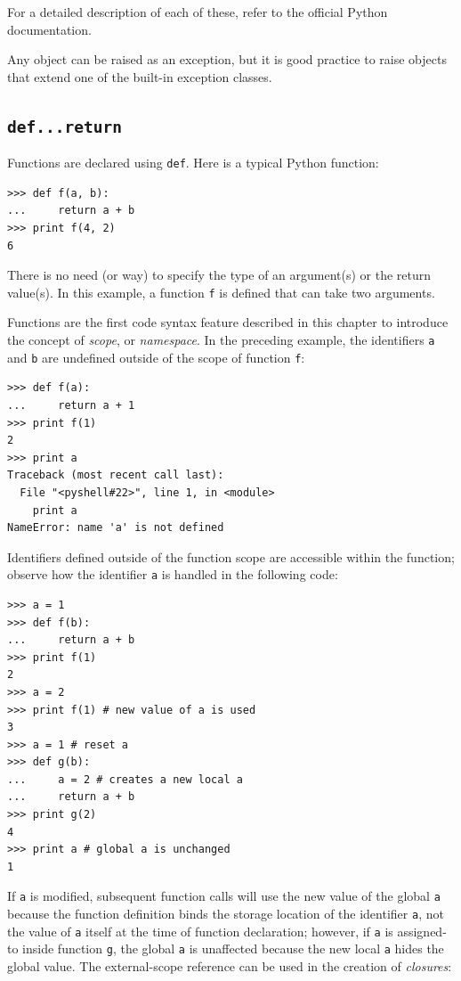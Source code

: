 \documentclass[justified,sixbynine]{tufte-book}
\def\ft{\small\tt}
\theoremstyle{plain}%
\theoremstyle{definition}
\theoremstyle{remark}
\begin{document}
\begin{fullwidth}
For a detailed description of each of these, refer to the official Python documentation.

Any object can be raised as an exception, but it is good practice to raise objects that extend one of the built-in exception classes.

\goodbreak\subsection{{\ft def...return}}

 

Functions are declared using {\ft def}.  Here is a typical Python function:
\begin{lstlisting}
>>> def f(a, b):
...     return a + b
>>> print f(4, 2)
6
\end{lstlisting}

There is no need (or way) to specify the type of an argument(s) or the return value(s). In this example, a function {\ft f} is defined that can take two arguments.


Functions are the first code syntax feature described in this chapter to introduce the concept of {\it scope}, or {\it namespace}.  In the preceding example, the identifiers {\ft a} and {\ft b} are undefined outside of the scope of function {\ft f}:
\begin{lstlisting}
>>> def f(a):
...     return a + 1
>>> print f(1)
2
>>> print a
Traceback (most recent call last):
  File "<pyshell#22>", line 1, in <module>
    print a
NameError: name 'a' is not defined
\end{lstlisting}

Identifiers defined outside of the function scope are accessible within the function; observe how the identifier {\ft a} is handled in the following code:

\begin{lstlisting}
>>> a = 1
>>> def f(b):
...     return a + b
>>> print f(1)
2
>>> a = 2
>>> print f(1) # new value of a is used
3
>>> a = 1 # reset a
>>> def g(b):
...     a = 2 # creates a new local a
...     return a + b
>>> print g(2)
4
>>> print a # global a is unchanged
1
\end{lstlisting}

If {\ft a} is modified, subsequent function calls will use the new value of the global {\ft a} because the function definition binds the storage location of the identifier {\ft a}, not the value of {\ft a} itself at the time of function declaration; however, if {\ft a} is assigned-to inside function {\ft g}, the global {\ft a} is unaffected because the new local {\ft a} hides the global value.  The external-scope reference can be used in the creation of {\it closures}:


\end{fullwidth}
\end{document}
